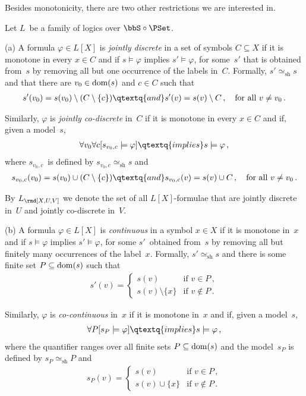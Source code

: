 \documentclass[10pt, fleqn]{scrartcl}
\DeclareRobustCommand*{\dom}{\qopname\relax o{dom}}
\newcommand*{\sh}{\mathrm{sh}}
\newcommand*{\?}{\kern .08em}
\begin{document}
Besides monotonicity, there are two other restrictions we are interested in.
\begin{Def}
Let $L$~be a family of logics over $\bbS \circ \PSet$.

(a) A formula $\varphi \in L[X]$ is \emph{jointly discrete} in a set of symbols $C \subseteq X$
if it is monotone in every $x \in C$ and if $s \models \varphi$ implies
$s' \models \varphi$, for some~$s'$ that is obtained from~$s$ by removing all but one occurrence
of the labels in~$C$. Formally, $s' \simeq_\sh s$ and that there are
$v_0 \in \dom(s)$ and $c \in C$ such that
\begin{align*}
  s'(v_0) = s(v_0) \setminus (C \setminus \{c\})
  \qtextq{and}
  s'(v) = s(v) \setminus C\,, \quad\text{for all } v \neq v_0\,.
\end{align*}

Similarly, $\varphi$ is \emph{jointly co-discrete} in~$C$
if it is monotone in every $x \in C$ and if, given a model~$s$,
\begin{align*}
  \forall v_0\forall c[s_{v_0,c} \models \varphi]
  \qtextq{implies}
  s \models \varphi\,,
\end{align*}
where $s_{v_0,c}$~is defined by $s_{v_0,c} \simeq_\sh s$ and
\begin{align*}
  s_{v_0,c}(v_0) = s(v_0) \cup (C \setminus \{c\})
  \qtextq{and}
  s_{v_0,c}(v) = s(v) \cup C\,, \quad\text{for all } v \neq v_0\,.
\end{align*}

By $L_\rmd[X,U,V]$ we denote the set of all $L[X]$-formulae that are
jointly discrete in~$U$ and jointly co-discrete in~$V$.

(b) A formula $\varphi \in L[X]$ is \emph{continuous} in a symbol $x \in X$ if it is
monotone in~$x$ and if $s \models \varphi$ implies $s' \models \varphi$, for some
$s'$~obtained from~$s$ by removing all but finitely many occurrences of the label~$x$.
Formally, $s' \simeq_\sh s$ and there is some finite set $P \subseteq \dom(s)$ such that
\begin{align*}
  s'(v) = \begin{cases}
            s(v)                 &\text{if } v \in P\,, \\
            s(v) \setminus \{x\} &\text{if } v \notin P\,.
          \end{cases}
\end{align*}

Similarly, $\varphi$ is \emph{co-continuous} in~$x$ if it is
monotone in~$x$ and if, given a model~$s$,
\begin{align*}
  \forall P[s_P \models \varphi]
  \qtextq{implies}
  s \models \varphi\,,
\end{align*}
where the quantifier ranges over all finite sets $P \subseteq \dom(s)$ and
the model~$s_P$ is defined by $s_P \simeq_\sh P$ and
\begin{align*}
  s_P(v) = \begin{cases}
             s(v)            &\text{if } v \in P\,, \\
             s(v) \cup \{x\} &\text{if } v \notin P\,.
           \end{cases}
\end{align*}


\end{Def}
\end{document}

